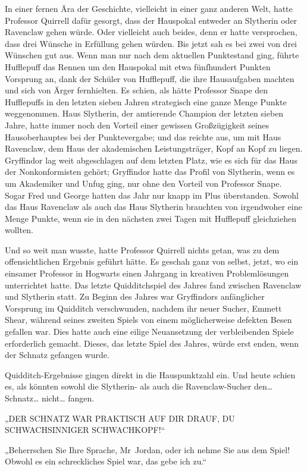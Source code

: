 {In einer fernen Ära der Geschichte, vielleicht in einer ganz anderen Welt, hatte Professor Quirrell dafür gesorgt, dass der Hauspokal entweder an Slytherin oder Ravenclaw gehen würde. Oder vielleicht auch beides, denn er hatte versprochen, dass drei Wünsche in Erfüllung gehen würden. Bis jetzt sah es bei zwei von drei Wünschen gut aus. Wenn man nur nach dem aktuellen Punktestand ging, führte Hufflepuff das Rennen um den Hauspokal mit etwa fünfhundert Punkten Vorsprung an, dank der Schüler von Hufflepuff, die ihre Hausaufgaben machten und sich von Ärger fernhielten. Es schien, als hätte Professor Snape den Hufflepuffs in den letzten sieben Jahren strategisch eine ganze Menge Punkte weggenommen. Haus Slytherin, der amtierende Champion der letzten sieben Jahre, hatte immer noch den Vorteil einer gewissen Großzügigkeit seines Hausoberhauptes bei der Punktevergabe; und das reichte aus, um mit Haus Ravenclaw, dem Haus der akademischen Leistungsträger, Kopf an Kopf zu liegen. Gryffindor lag weit abgeschlagen auf dem letzten Platz, wie es sich für das Haus der Nonkonformisten gehört; Gryffindor hatte das Profil von Slytherin, wenn es um Akademiker und Unfug ging, nur ohne den Vorteil von Professor Snape. Sogar Fred und George hatten das Jahr nur knapp im Plus überstanden. Sowohl das Haus Ravenclaw als auch das Haus Slytherin brauchten von irgendwoher eine Menge Punkte, wenn sie in den nächsten zwei Tagen mit Hufflepuff gleichziehen wollten.

Und so weit man wusste, hatte Professor Quirrell nichts getan, was zu dem offensichtlichen Ergebnis geführt hätte. Es geschah ganz von selbst, jetzt, wo ein einsamer Professor in Hogwarts einen Jahrgang in kreativen Problemlösungen unterrichtet hatte. Das letzte Quidditchspiel des Jahres fand zwischen Ravenclaw und Slytherin statt. Zu Beginn des Jahres war Gryffindors anfänglicher Vorsprung im Quidditch verschwunden, nachdem ihr neuer Sucher, Emmett Shear, während seines zweiten Spiels von einem möglicherweise defekten Besen gefallen war. Dies hatte auch eine eilige Neuansetzung der verbleibenden Spiele erforderlich gemacht. Dieses, das letzte Spiel des Jahres, würde erst enden, wenn der Schnatz gefangen wurde.

Quidditch-Ergebnisse gingen direkt in die Hauspunktzahl ein. Und heute schien es, als könnten sowohl die Slytherin- als auch die Ravenclaw-Sucher den… Schnatz… nicht… fangen.

„DER SCHNATZ WAR PRAKTISCH AUF DIR DRAUF, DU SCHWACHSINNIGER SCHWACHKOPF!“

„Beherrschen Sie Ihre Sprache, Mr~Jordan, oder ich nehme Sie aus dem Spiel! Obwohl es ein schreckliches Spiel war, das gebe ich zu.“

}

